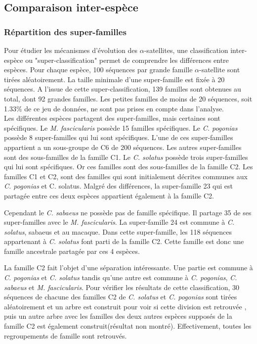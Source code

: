 \documentclass[12pt,a4paper]{article}
\begin{document}
	
	\subsection{Comparaison inter-espèce}
	\subsubsection{Répartition des super-familles}
				Pour étudier les mécanismes d'évolution des $\alpha$-satellites, une classification inter-espèce ou "super-classification" permet de comprendre les différences entre espèces. Pour chaque espèce, 100 séquences par grande famille  $\alpha$-satellite sont tirées aléatoirement. La taille minimale d'une super-famille est fixée à 20 séquences. A l'issue de cette super-classification, 139 familles sont obtenues au total, dont 92 grandes familles. Les petites familles de moins de 20 séquences, soit 1.33\% de ce jeu de données, ne sont pas prises en compte dans l'analyse.\\
				
				Les différentes espèces partagent des super-familles, mais certaines sont spécifiques. Le \textit{M. fascicularis} possède 15 familles spécifiques. Le \textit{C. pogonias} possède 8 super-familles qui lui sont spécifiques. L'une de ces super-familles appartient a un sous-groupe de C6 de 200 séquences. Les autres super-familles sont des sous-familles de la famille C1. Le \textit{C. solatus} possède trois super-familles qui lui sont spécifiques. Or ces familles sont des sous-familles de la famille C2. Les familles C1 et C2, sont des familles qui sont initialement décrites communes aux \textit{C. pogonias} et {C. solatus}. Malgré des différences, la super-famille 23 qui est partagée entre ces deux espèces appartient également à la famille C2.
				
				Cependant le \textit{C. sabaeus} ne possède pas de famille spécifique. Il partage 35 de ses super-familles avec le \textit{M. fascicularis}. La super-famille 24 est commune à \textit{C. solatus}, sabaeus et au macaque. Dans cette super-famille, les 118 séquences appartenant à \textit{C. solatus} font parti de la famille C2. Cette famille est donc une famille ancestrale partagée par ces 4 espèces. 
				
				La famille C2 fait l'objet d'une séparation intéressante. Une partie est commune à \textit{C. pogonias} et \textit{C. solatus} tandis qu'une autre est commune à \textit{C. pogonias}, \textit{C. sabaeus} et \textit{M. fascicularis}. Pour vérifier les résultats de cette classification, 30 séquences de chacune des familles C2 de \textit{C. solatus} et \textit{C. pogonias} sont tirées aléatoirement et un arbre est construit pour voir si cette division est retrouvée , puis un autre arbre avec les familles des deux autres espèces supposés de la famille C2 est également construit(résultat non montré). Effectivement, toutes les regroupements de famille sont retrouvés.
							
\end{document}
